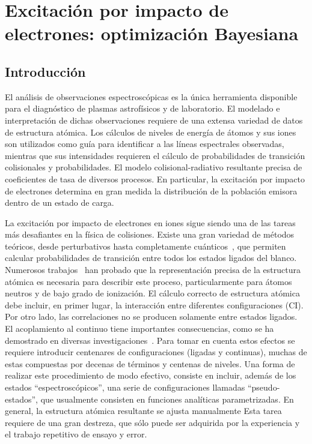 \chapter{Excitación por impacto de electrones: optimización Bayesiana}
\label{chap:bayeopt}

\section{Introducción}
\label{sec:intro}

El análisis de observaciones espectroscópicas es la única herramienta 
disponible para el diagnóstico de plasmas astrofísicos y de laboratorio. 
El modelado e interpretación de dichas observaciones requiere de una 
extensa variedad de datos de estructura atómica. Los cálculos de niveles 
de energía de átomos y sus iones son utilizados como guía para 
identificar a las líneas espectrales observadas, mientras que sus 
intensidades requieren el cálculo de probabilidades de transición 
colisionales y probabilidades. El modelo 
colisional-radiativo resultante precisa de coeficientes de tasa de 
diversos procesos. En particular, la excitación por impacto de 
electrones determina en gran medida la distribución de la población 
emisora dentro de un estado de carga. 

La excitación por impacto de electrones en iones sigue siendo una de las 
tareas más desafiantes en la física de colisiones. Existe una gran 
variedad de métodos teóricos, desde perturbativos hasta completamente 
cuánticos~\cite{Pindzola:07,Burke:11,Bray:17,Zatsarinny:04}, que 
permiten calcular probabilidades de transición entre todos los estados 
ligados del blanco. Numerosos trabajos~\cite{Bartschat:04,Zatsarinny:16,
Be_Ballance:03} han probado que la representación precisa de la 
estructura atómica es necesaria para describir este proceso, 
particularmente para átomos neutros y de bajo grado de ionización. 
El cálculo correcto de estructura atómica debe incluir, en primer lugar, 
la interacción entre diferentes configuraciones (CI). Por otro lado, las 
correlaciones no se producen solamente entre estados ligados. El 
acoplamiento al continuo tiene importantes consecuencias, como se ha 
demostrado en diversas investigaciones~\cite{Ballance:03,Badnell:03,
Mitnik:03}. Para tomar en cuenta estos efectos se requiere introducir 
centenares de configuraciones (ligadas y continuas), muchas de estas 
compuestas por decenas de términos y centenas de niveles. Una forma de 
realizar este procedimiento de modo efectivo, consiste en incluir, 
además de los estados ``espectroscópicos'', una serie de configuraciones 
llamadas ``pseudo-estados'', que usualmente consisten en funciones 
analíticas parametrizadas. 
En general, la estructura atómica resultante se ajusta manualmente Esta
tarea requiere de una gran destreza, que sólo puede ser adquirida 
por la experiencia y el trabajo repetitivo de ensayo y error.

